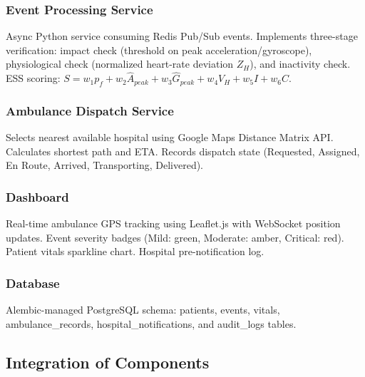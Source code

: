 \subsubsection{Event Processing Service}
Async Python service consuming Redis Pub/Sub events. Implements three-stage verification: impact check (threshold on peak acceleration/gyroscope), physiological check (normalized heart-rate deviation $Z_H$), and inactivity check. ESS scoring: $S = w_1 p_f + w_2 \hat{A}_{peak} + w_3 \hat{G}_{peak} + w_4 V_H + w_5 I + w_6 C$.

\subsubsection{Ambulance Dispatch Service}
Selects nearest available hospital using Google Maps Distance Matrix API. Calculates shortest path and ETA. Records dispatch state (Requested, Assigned, En Route, Arrived, Transporting, Delivered).

\subsubsection{Dashboard}
Real-time ambulance GPS tracking using Leaflet.js with WebSocket position updates. Event severity badges (Mild: green, Moderate: amber, Critical: red). Patient vitals sparkline chart. Hospital pre-notification log.

\subsubsection{Database}
Alembic-managed PostgreSQL schema: patients, events, vitals, ambulance\_records, hospital\_notifications, and audit\_logs tables.

\subsection{Integration of Components}


